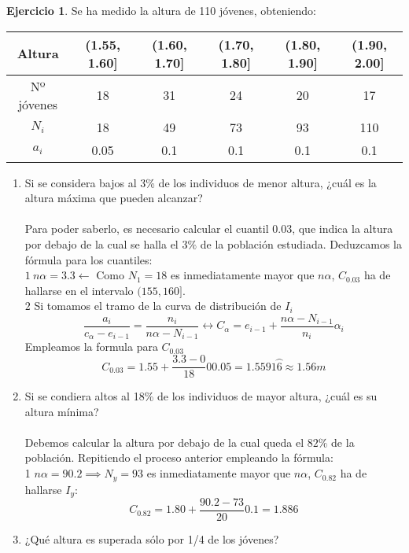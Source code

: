 \documentclass[a4paper, 12pt]{article}
\theoremstyle{definition}
\newtheorem{ej}{Ejercicio}
\begin{document}
\begin{ej}
Se ha medido la altura de 110 jóvenes, obteniendo:

\begin{center}
    \begin{tabular}{|c|c|c|c|c|c|}
    \hline
    Altura & (1.55, 1.60] & (1.60, 1.70] & (1.70, 1.80] & (1.80, 1.90] & (1.90, 2.00] \\
    \hline
    Nº jóvenes & 18 & 31 & 24 & 20 & 17 \\
    \hline
     $N_{i}$ & 18 & 49 & 73 & 93 & 110 \\
    \hline
    $a_{i}$ & 0.05 & 0.1 & 0.1 & 0.1 & 0.1 \\
    \hline
    \end{tabular}
\end{center}

\begin{enumerate}[label=\textit{\alph*)}]
    \item Si se considera bajos al 3\% de los individuos de menor altura, ¿cuál es la altura máxima que pueden alcanzar?
    \\\\
    Para poder saberlo, es necesario calcular el cuantil $0.03$, que indica la altura por debajo de la cual se halla el $3\%$ de la población estudiada. Deduzcamos la fórmula para los cuantiles:
  \\ 
  $1 \ n\alpha = 3.3 \leftarrow$ Como $N_{1} = 18$ es inmediatamente mayor que $n\alpha$, $C_{0.03}$ ha de hallarse en el intervalo $(155,160]$. \\
    $2$ Si tomamos el tramo de la curva de distribución de $I_{i}$ 
    $$\frac{a_{i}}{c_{\alpha}-e_{i-1}} = \frac{n_{i}}{n\alpha - N_{i-1}} \longleftrightarrow C_{\alpha} = e_{i-1} + \frac{n\alpha - N_{i-1}}{n_{i}}\alpha_{i}$$
    Empleamos la formula para $C_{0.03}$ 
    $$C_{0.03} = 1.55 + \frac{3.3 - 0}{18}0 0.05 = 1.5591\wideparen{6} \approx 1.56 m$$
    \item Si se condiera altos al 18\% de los individuos de mayor altura, ¿cuál es su altura mínima? \\\\
    Debemos calcular la altura por debajo de la cual queda el $82\%$ de la población. Repitiendo el proceso anterior empleando la fórmula: 
    \\
    1 $n\alpha=90.2 \implies N_{y} = 93$ es inmediatamente mayor que $n\alpha$, $C_{0.82}$ ha de hallarse $I_{y}$:
    $$C_{0.82} = 1.80 + \frac{90.2 - 73}{20}0.1 = 1.886$$
    \item ¿Qué altura es superada sólo por 1/4 de los jóvenes? \\\\

\end{enumerate}
\end{ej}
\end{document}
